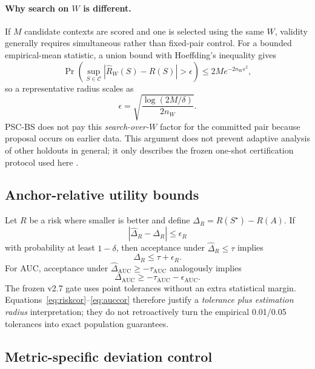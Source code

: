 \documentclass[10pt]{article}
\newcommand{\PSC}{\textsc{PSC-BS}}
\newcommand{\AUC}{\mathrm{AUC}}
\begin{document}
\paragraph{Why search on $W$ is different.}
If $M$ candidate contexts are scored and one is selected using the same $W$, validity generally requires simultaneous rather than fixed-pair control.
For a bounded empirical-mean statistic, a union bound with Hoeffding's inequality gives
\begin{equation}
\Pr\!\left(
\sup_{S\in\mathcal C}|\widehat R_W(S)-R(S)|>\epsilon
\right)
\le 2M e^{-2n_W\epsilon^2},
\end{equation}
so a representative radius scales as
\begin{equation}
\epsilon=\sqrt{\frac{\log(2M/\delta)}{2n_W}}.
\end{equation}
\PSC{} does not pay this \emph{search-over-$W$} factor for the committed pair because proposal occurs on earlier data.
This argument does not prevent adaptive analysis of other holdouts in general; it only describes the frozen one-shot certification protocol used here \citep{dwork2015reusable}.

\subsection{Anchor-relative utility bounds}

Let $R$ be a risk where smaller is better and define $\Delta_R=R(S^\star)-R(A)$.
If
\begin{equation}
|\widehat\Delta_R-\Delta_R|\le \epsilon_R
\end{equation}
with probability at least $1-\delta$, then acceptance under $\widehat\Delta_R\le \tau$ implies
\begin{equation}
\Delta_R\le \tau+\epsilon_R.
\label{eq:riskcor}
\end{equation}
For AUC, acceptance under $\widehat\Delta_{\AUC}\ge-\tau_{\AUC}$ analogously implies
\begin{equation}
\Delta_{\AUC}\ge-\tau_{\AUC}-\epsilon_{\AUC}.
\label{eq:auccor}
\end{equation}
The frozen v2.7 gate uses point tolerances without an extra statistical margin.
Equations~\eqref{eq:riskcor}--\eqref{eq:auccor} therefore justify a \emph{tolerance plus estimation radius} interpretation; they do not retroactively turn the empirical 0.01/0.05 tolerances into exact population guarantees.

\subsection{Metric-specific deviation control}
\end{document}
